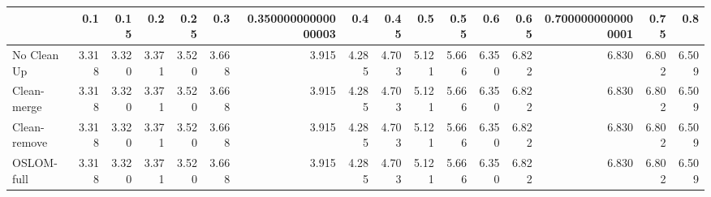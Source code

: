 \begin{tabular}{lrrrrrrrrrrrrrrr}
\toprule
{} &   0.1 &  0.15 &   0.2 &  0.25 &   0.3 & 0.35000000000000003 &   0.4 &  0.45 &   0.5 &  0.55 &   0.6 &  0.65 & 0.7000000000000001 &  0.75 &   0.8 \\
\midrule
No Clean Up  & 3.318 & 3.320 & 3.371 & 3.520 & 3.668 &               3.915 & 4.285 & 4.703 & 5.121 & 5.666 & 6.350 & 6.822 &              6.830 & 6.802 & 6.509 \\
Clean-merge  & 3.318 & 3.320 & 3.371 & 3.520 & 3.668 &               3.915 & 4.285 & 4.703 & 5.121 & 5.666 & 6.350 & 6.822 &              6.830 & 6.802 & 6.509 \\
Clean-remove & 3.318 & 3.320 & 3.371 & 3.520 & 3.668 &               3.915 & 4.285 & 4.703 & 5.121 & 5.666 & 6.350 & 6.822 &              6.830 & 6.802 & 6.509 \\
OSLOM-full   & 3.318 & 3.320 & 3.371 & 3.520 & 3.668 &               3.915 & 4.285 & 4.703 & 5.121 & 5.666 & 6.350 & 6.822 &              6.830 & 6.802 & 6.509 \\
\bottomrule
\end{tabular}
